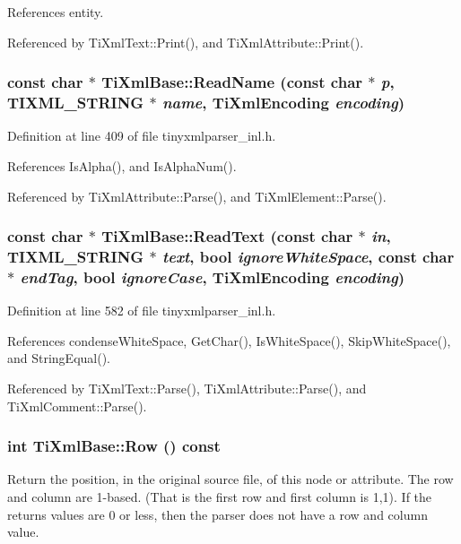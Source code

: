 References entity.

Referenced by TiXmlText::Print(), and TiXmlAttribute::Print().\hypertarget{class_ti_xml_base_a1c21a6ab5f7b503acd91f35f183734b3}{
\subsubsection[{ReadName}]{\setlength{\rightskip}{0pt plus 5cm}const char $\ast$ TiXmlBase::ReadName (const char $\ast$ {\em p}, \/  TIXML\_\-STRING $\ast$ {\em name}, \/  {\bf TiXmlEncoding} {\em encoding})}}
\label{class_ti_xml_base_a1c21a6ab5f7b503acd91f35f183734b3}


Definition at line 409 of file tinyxmlparser\_\-inl.h.

References IsAlpha(), and IsAlphaNum().

Referenced by TiXmlAttribute::Parse(), and TiXmlElement::Parse().\hypertarget{class_ti_xml_base_aa646c74921aa33156968b802bbf5566e}{
\subsubsection[{ReadText}]{\setlength{\rightskip}{0pt plus 5cm}const char $\ast$ TiXmlBase::ReadText (const char $\ast$ {\em in}, \/  TIXML\_\-STRING $\ast$ {\em text}, \/  bool {\em ignoreWhiteSpace}, \/  const char $\ast$ {\em endTag}, \/  bool {\em ignoreCase}, \/  {\bf TiXmlEncoding} {\em encoding})}}
\label{class_ti_xml_base_aa646c74921aa33156968b802bbf5566e}


Definition at line 582 of file tinyxmlparser\_\-inl.h.

References condenseWhiteSpace, GetChar(), IsWhiteSpace(), SkipWhiteSpace(), and StringEqual().

Referenced by TiXmlText::Parse(), TiXmlAttribute::Parse(), and TiXmlComment::Parse().\hypertarget{class_ti_xml_base_a024bceb070188df92c2a8d8852dd0853}{
\subsubsection[{Row}]{\setlength{\rightskip}{0pt plus 5cm}int TiXmlBase::Row () const}}
\label{class_ti_xml_base_a024bceb070188df92c2a8d8852dd0853}
Return the position, in the original source file, of this node or attribute. The row and column are 1-\/based. (That is the first row and first column is 1,1). If the returns values are 0 or less, then the parser does not have a row and column value.

